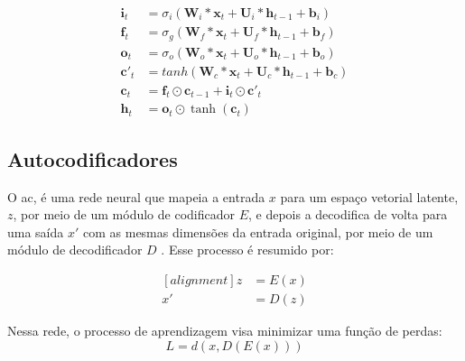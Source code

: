 \begin{equation}
\label{eq:conlstm}
\begin{aligned}
\textbf{i}_t &= \sigma_{i}(\textbf{W}_i*\textbf{x}_t + \textbf{U}_i*\textbf{h}_{t-1} + \textbf{b}_i) \\
\textbf{f}_t &= \sigma_{g}(\textbf{W}_f*\textbf{x}_t + \textbf{U}_f*\textbf{h}_{t-1} + \textbf{b}_f) \\
\textbf{o}_t &= \sigma_{o}(\textbf{W}_o*\textbf{x}_t + \textbf{U}_o*\textbf{h}_{t-1} + \textbf{b}_o) \\   
\textbf{c}'_t &= tanh(\textbf{W}_c*\textbf{x}_t + \textbf{U}_c*\textbf{h}_{t-1} + \textbf{b}_c) \\
\textbf{c}_t &= \textbf{f}_t \odot \textbf{c}_{t-1} + \textbf{i}_t \odot \textbf{c}'_t \\
\textbf{h}_t & = \textbf{o}_t \odot \tanh(\textbf{c}_t)  
\end{aligned}
\end{equation}


\subsection{Autocodificadores}


O \gls{ac}, é uma rede neural que mapeia a entrada $x$ para um espaço vetorial latente, $z$, por meio de um módulo de codificador $E$, e depois a decodifica de volta para uma saída $x'$ com as mesmas dimensões da entrada original, por meio de um módulo de decodificador $D$ \cite{FrancoisDeepLearning}. Esse processo é resumido por: 

\begin{equation}
\begin{aligned}[alignment]
z &= E(x)\\ 
x' &= D(z)	
\end{aligned}
\end{equation}

Nessa rede, o processo de aprendizagem visa minimizar uma função de perdas:
\begin{equation}
L = d(x,D(E(x)))
\end{equation}

